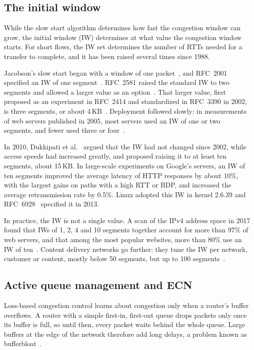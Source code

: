 \subsection{The initial window}\label{sec:bg-iw}

While the slow start algorithm determines how fast the congestion window can grow, the initial window
(IW) determines at what value the congestion window starts. For short flows, the IW set determines the number of RTTs needed for a transfer to complete, and it has been raised several times since 1988.

Jacobson's slow start began with a window of one packet~\cite{jacobson1988congestion},
and RFC~2001 specified an IW of one segment~\cite{rfc2001}. RFC~2581 raised the
standard IW to two segments and allowed a larger value as an
option~\cite{rfc2581}. That larger value, first proposed as an experiment in RFC~2414
and standardized in RFC~3390 in 2002, is
three segments, or about 4\,KB~\cite{rfc2414,rfc3390}. Deployment followed slowly: in measurements of web servers published in 2005, most servers used an IW of one or two segments, and fewer used three or four~\cite{medina2005measuring}.

In 2010, Dukkipati et al.~\cite{dukkipati2010argument} argued that the IW had not changed since 2002, while
access speeds had increased greatly, and proposed raising it to at least ten
segments, about 15\,KB. In large-scale experiments on
Google's servers, an IW of ten segments improved the average latency of HTTP
responses by about 10\%, with the largest gains on paths with a high RTT or BDP,
and increased the average retransmission rate by 0.5\%.
Linux adopted this IW in kernel 2.6.39 and RFC~6928~\cite{rfc6928} specified it in 2013.

In practice, the IW is not a single value. A scan of the IPv4 address space in
2017 found that IWs of 1, 2, 4 and 10 segments together account for more than 97\% of
web servers, and that among the most popular websites, more than 80\% use an IW of
ten~\cite{ruth2017large}. Content delivery networks go further: they tune the IW per
network, customer or content, mostly below 50 segments, but up to 100
segments~\cite{ruth2019iw}. 

\subsection{Active queue management and ECN}\label{sec:bg-ecn-aqm}

Loss-based congestion control learns about congestion only when a router's buffer
overflows. A router with a simple first-in, first-out queue drops packets only once
its buffer is full, so until then, every packet waits behind the whole queue. Large
buffers at the edge of the network therefore add long delays, a problem known as
bufferbloat~\cite{gettys2012bufferbloat}.


